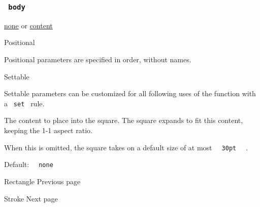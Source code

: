 \subsubsection{\texorpdfstring{\texttt{\ body\ }}{ body }}\label{parameters-body}

\href{/docs/reference/foundations/none/}{none} {or}
\href{/docs/reference/foundations/content/}{content}

{{ Positional }}

\label{parameters-body-positional-tooltip}
Positional parameters are specified in order, without names.

{{ Settable }}

\label{parameters-body-settable-tooltip}
Settable parameters can be customized for all following uses of the
function with a \texttt{\ set\ } rule.

The content to place into the square. The square expands to fit this
content, keeping the 1-1 aspect ratio.

When this is omitted, the square takes on a default size of at most
\texttt{\ }{\texttt{\ 30pt\ }}\texttt{\ } .

Default: \texttt{\ }{\texttt{\ none\ }}\texttt{\ }

\href{/docs/reference/visualize/rect/}{\pandocbounded{}}

{ Rectangle } { Previous page }

\href{/docs/reference/visualize/stroke/}{\pandocbounded{}}

{ Stroke } { Next page }
